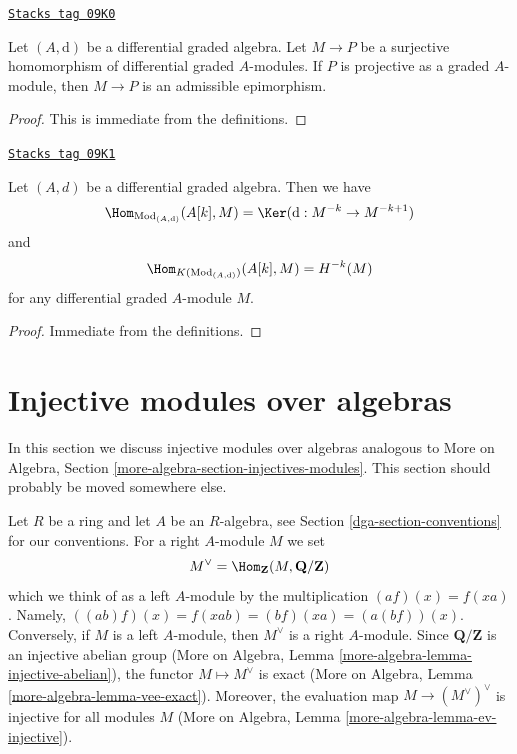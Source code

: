 \begin{lemma}
\label{dga-lemma-target-graded-projective}
\href{https://stacks.math.columbia.edu/tag/09K0}{\texttt{Stacks tag 09K0}}

Let $(A, \text{d})$ be a differential graded algebra.
Let $M \to P$ be a surjective homomorphism of differential graded
$A$-modules. If $P$ is projective as a graded $A$-module, then
$M \to P$ is an admissible epimorphism.
\end{lemma}

\begin{proof}
This is immediate from the definitions.
\end{proof}

\begin{lemma}
\label{dga-lemma-hom-from-shift-free}
\href{https://stacks.math.columbia.edu/tag/09K1}{\texttt{Stacks tag 09K1}}

Let $(A, d)$ be a differential graded algebra. Then we have
$$
\Hom_{\text{Mod}_{(A, \text{d})}}(A[k], M) =
\Ker(\text{d} : M^{-k} \to M^{-k + 1})
$$
and
$$
\Hom_{K(\text{Mod}_{(A, \text{d})})}(A[k], M) = H^{-k}(M)
$$
for any differential graded $A$-module $M$.
\end{lemma}

\begin{proof}
Immediate from the definitions.
\end{proof}

\section{Injective modules over algebras}
\label{dga-section-modules-noncommutative}
In this section we discuss injective modules over algebras
analogous to
More on Algebra, Section \ref{more-algebra-section-injectives-modules}.
This section should probably be moved somewhere else.

\medskip\noindent
Let $R$ be a ring and let $A$ be an
$R$-algebra, see Section \ref{dga-section-conventions} for our conventions.
For a right $A$-module $M$ we set
$$
M^\vee = \Hom_\mathbf{Z}(M, \mathbf{Q}/\mathbf{Z})
$$
which we think of as a left $A$-module by the multiplication
$(a f)(x) = f(xa)$. Namely, $((ab)f)(x) = f(xab) = (bf)(xa) = (a(bf))(x)$.
Conversely, if $M$ is a left $A$-module, then $M^\vee$ is a right
$A$-module. Since $\mathbf{Q}/\mathbf{Z}$ is an injective abelian
group (More on Algebra, Lemma \ref{more-algebra-lemma-injective-abelian}), the
functor $M \mapsto M^\vee$ is exact
(More on Algebra, Lemma \ref{more-algebra-lemma-vee-exact}).
Moreover, the evaluation map $M \to (M^\vee)^\vee$ is
injective for all modules $M$
(More on Algebra, Lemma \ref{more-algebra-lemma-ev-injective}).

